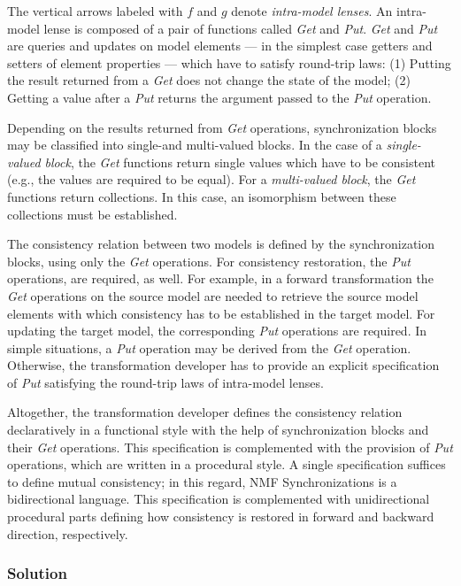 The vertical arrows labeled with $f$ and $g$ denote \emph{intra-model lenses}. An intra-model lense is composed of a pair of functions called \emph{Get} and \emph{Put}. \emph{Get} and \emph{Put} are queries and updates on model elements --- in the simplest case getters and setters of element properties --- which have to satisfy round-trip laws: (1) Putting the result returned from a \emph{Get} does not change the state of the model; (2) Getting a value after a \emph{Put} returns the argument passed to the \emph{Put} operation.

Depending on the results returned from \emph{Get} operations, synchronization blocks may be classified into single-and multi-valued blocks. In the case of a \emph{single-valued block}, the \emph{Get} functions return single values which have to be consistent (e.g., the values are required to be equal). For a \emph{multi-valued block}, the \emph{Get} functions return collections. In this case, an isomorphism between these collections must be established.

The consistency relation between two models is defined by the synchronization blocks, using only the \emph{Get} operations. For consistency restoration, the \emph{Put} operations, are required, as well. For example, in a forward transformation the \emph{Get} operations on the source model are needed to retrieve the source model elements with which consistency has to be established in the target model. For updating the target model, the corresponding \emph{Put} operations are required. In simple situations, a \emph{Put} operation may be derived from the \emph{Get} operation. Otherwise, the transformation developer has to provide an explicit specification of \emph{Put} satisfying the round-trip laws of intra-model lenses. 

Altogether, the transformation developer defines the consistency relation declaratively in a functional style with the help of synchronization blocks and their \emph{Get} operations. This specification is complemented with the provision of \emph{Put} operations, which are written in a procedural style. A single specification suffices to define mutual consistency; in this regard, NMF Synchronizations is a bidirectional language. This specification is complemented with unidirectional procedural parts defining how consistency is restored in forward and backward direction, respectively.

\subsubsection{Solution}
\label{sec:solutionNMF}

